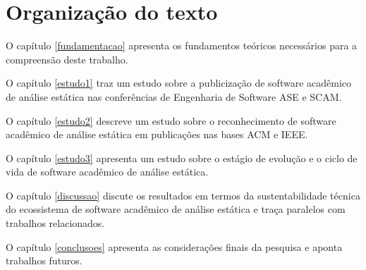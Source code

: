 \section{Organização do texto}

O capítulo \ref{fundamentacao} apresenta os fundamentos teóricos necessários
para a compreensão deste trabalho.

O capítulo \ref{estudo1} traz um estudo sobre a publicização de software
acadêmico de análise estática nas conferências de Engenharia de Software ASE e
SCAM.

O capítulo \ref{estudo2} descreve um estudo sobre o reconhecimento de software
acadêmico de análise estática em publicações nas bases ACM e IEEE.

O capítulo \ref{estudo3} apresenta um estudo sobre o estágio de evolução e o
ciclo de vida de software acadêmico de análise estática.

O capítulo \ref{discussao} discute os resultados em termos da sustentabilidade
técnica do ecossistema de software acadêmico de análise estática e traça
paralelos com trabalhos relacionados.

O capítulo \ref{conclusoes} apresenta as considerações finais da pesquisa e
aponta trabalhos futuros.





